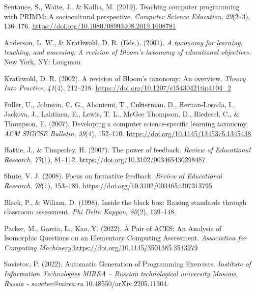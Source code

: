 \begin{thebibliography}{99}
Sentance, S., Waite, J., \& Kallia, M. (2019).
Teaching computer programming with PRIMM: A sociocultural perspective.
\textit{Computer Science Education}, \textit{29}(2--3), 136--176.
\url{https://doi.org/10.1080/08993408.2019.1608781}

Anderson, L. W., \& Krathwohl, D. R. (Eds.). (2001).
\textit{A taxonomy for learning, teaching, and assessing: A revision of Bloom's taxonomy of educational objectives}.
New York, NY: Longman.

 Krathwohl, D. R. (2002). A revision of Bloom's taxonomy: An overview. \textit{Theory Into Practice}, \textit{41}(4), 212--218. \url{https://doi.org/10.1207/s15430421tip4104_2}

Fuller, U., Johnson, C. G., Ahoniemi, T., Cukierman, D., Hernan-Losada, I., Jackova, J., Lahtinen, E., Lewis, T. L., McGee Thompson, D., Riedesel, C., \& Thompson, E. (2007).
Developing a computer science-specific learning taxonomy.
\textit{ACM SIGCSE Bulletin}, \textit{39}(4), 152--170.
\url{https://doi.org/10.1145/1345375.1345438}

Hattie, J., \& Timperley, H. (2007).
The power of feedback.
\textit{Review of Educational Research}, \textit{77}(1), 81--112. \url{https://doi.org/10.3102/003465430298487}

Shute, V. J. (2008).
Focus on formative feedback.
\textit{Review of Educational Research}, \textit{78}(1), 153--189. \url{https://doi.org/10.3102/0034654307313795}

Black, P., \& Wiliam, D. (1998).
Inside the black box: Raising standards through classroom assessment.
\textit{Phi Delta Kappan}, \textit{80}(2), 139--148.

 Parker, M., Garcia, L., Kao, Y. (2022). A Pair of ACES: An Analysis of Isomorphic Questions on an Elementary Computing Assessment.
\textit{Association for Computing Machinery} 
\url{https://doi.org/10.1145/3501385.3543979}

Sovietov, P. (2022). Automatic Generation of Programming Exercises. \textit{Institute of Information Technologies MIREA – Russian technological university Moscow, Russia - sovetov@mirea.ru} 10.48550/arXiv.2205.11304. 


\end{thebibliography}

